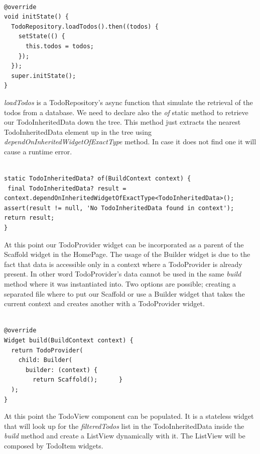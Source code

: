 \begin{verbatim}

@override
void initState() {
  TodoRepository.loadTodos().then((todos) {
    setState(() {
      this.todos = todos;
    });
  });
  super.initState();
}
\end{verbatim}

\textit{loadTodos }is a TodoRepository’s async function that simulate the retrieval of the todos from a database.
We need to declare also the \textit{of} static method to retrieve our TodoInheritedData down the tree. This method just extracts the nearest TodoInheritedData element up in the tree using \textit{dependOnInheritedWidgetOfExactType} method. In case it does not find one it will cause a runtime error.
\mbox{}\\


\begin{verbatim}

static TodoInheritedData? of(BuildContext context) {
 final TodoInheritedData? result = context.dependOnInheritedWidgetOfExactType<TodoInheritedData>(); 
assert(result != null, 'No TodoInheritedData found in context');
return result;
}
\end{verbatim}

At this point our TodoProvider widget can be incorporated as a parent of the Scaffold widget in the HomePage. The usage of the Builder widget is due to the fact that data is accessible only in a context where a TodoProvider is already present. In other word TodoProvider’s data cannot be used in the same \textit{build } method where it was instantiated into. Two options are possible; creating a separated file where to put our Scaffold or use a Builder widget that takes the current context and creates another with a TodoProvider widget.
\mbox{}\\


\begin{verbatim}

@override
Widget build(BuildContext context) {
  return TodoProvider(
    child: Builder(
      builder: (context) {
        return Scaffold();      }
  );
}
\end{verbatim}

At this point the TodoView component can be populated. It is a stateless widget that will look up for the \textit{filteredTodos} list in the TodoInheritedData inside the \textit{build} method and create a ListView dynamically with it. The ListView will be composed by TodoItem widgets.
\mbox{}\\


